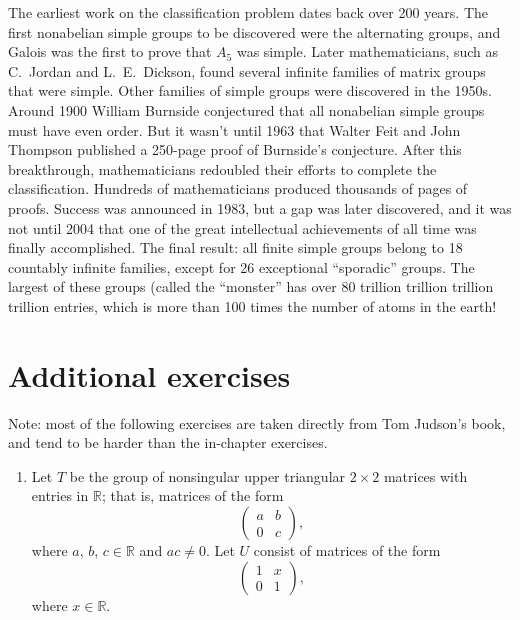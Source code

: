 {{The earliest work on the classification problem dates back over 200 years.  The first nonabelian simple groups to be discovered were the alternating groups, and Galois was the first to prove that $A_5$ was
simple. Later mathematicians, such as C.~Jordan and
L.~E.~Dickson, found several infinite families of
matrix groups that were simple. Other families of simple groups were
discovered in the 1950s.  Around 1900 William
Burnside conjectured that all nonabelian
simple groups must have even order. But it wasn't until 1963 that
 Walter Feit and John Thompson published a 250-page  proof of Burnside's conjecture.
After this breakthrough, mathematicians redoubled their efforts to complete the classification. Hundreds of mathematicians produced thousands of pages of proofs. Success was announced in 1983, but a gap was later discovered, and it was not until 2004 that one of the great intellectual achievements of all time was finally accomplished. The final result:  all finite simple groups belong to 18 countably infinite families, except for 26 exceptional ``sporadic'' groups.  The largest of these groups (called the ``monster'' has over 80 trillion trillion trillion trillion entries, which is more than 100 times the number of atoms in the earth!
\histbox 
}
 
 
\section*{Additional exercises}
\exrule
 
{\small
Note: most of the following exercises are taken directly from Tom Judson's book, and tend to be harder than the in-chapter exercises.

\begin{enumerate}
 
 

 
\item
Let $T$ be the group of nonsingular upper triangular $2 \times 2$
matrices with entries in ${\mathbb R}$; that is, matrices of the form
\[
\begin{pmatrix}
a & b \\
0 & c
\end{pmatrix},
\]
where $a$, $b$, $c \in {\mathbb R}$ and $ac \neq 0$. Let $U$ consist of
matrices of the form 
\[
\begin{pmatrix}
1 & x \\
0 & 1
\end{pmatrix},
\]
where $x \in {\mathbb R}$.
\begin{enumerate}
 

\end{enumerate}
\end{enumerate}}}
